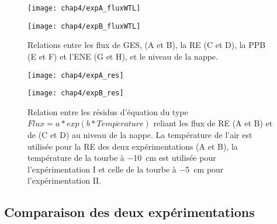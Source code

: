 \begin{figure}
\centering
\begin{minipage}{.5\textwidth}
\centering
\texttt{[image: chap4/expA\_fluxWTL]}
\end{minipage}%
\begin{minipage}{.5\textwidth}
\centering
\texttt{[image: chap4/expB\_fluxWTL]}
\end{minipage}%
\caption{Relations entre les flux de GES, \chh (A et B), la RE (C et D), la PPB (E et F) et l'ENE (G et H), et le niveau de la nappe.}
\label{fig:hm_wtl}
\end{figure}

\begin{figure}[!tbp]
\centering
\hspace*{-2cm}
\begin{minipage}[]{.55\textwidth}
\texttt{[image: chap4/expA\_res]}
\end{minipage}
\hspace*{.1cm}
\begin{minipage}[]{.55\textwidth}
\texttt{[image: chap4/expB\_res]}
\end{minipage}
\hspace*{-2cm}
\caption{Relation entre les résidus d'équation du type $Flux=a*exp(b*Temp\acute{e}rature) $ reliant les flux de RE (A et B) et de \chh (C et D) au niveau de la nappe. La température de l'air est utilisée pour la RE des deux expérimentations (A et B), la température de la tourbe à \SI{-10}{\centi\metre} est utilisée pour l'expérimentation I et celle de la tourbe à \SI{-5}{\centi\metre} pour l'expérimentation II.}
\label{fig:HM_res}
\end{figure}


\subsection{Comparaison des deux expérimentations}

